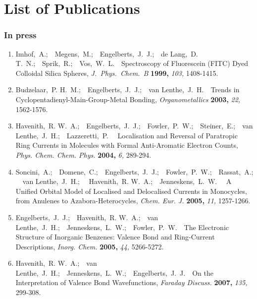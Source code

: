 \chapter*{List of Publications}
\label{lop}
\fancyhead[RO]{\thepage}
\fancyhead[LE]{\thepage}

\subsection*{In press}
\begin{enumerate}
\item
Imhof,~A.;\ \ Megens,~M.;\ \ Engelberts,~J.~J.;\ \ de Lang,~D. T.~N.;\ \ Sprik,~R.;\ \ Vos,~W.~L.\ \ Spectroscopy of
Fluorescein (FITC) Dyed Colloidal Silica Spheres, \textit{J.~Phys.~Chem.~B} \textbf{1999,} \textsl{103,} 1408-1415.

\item
Budzelaar,~P. H.~M.;\ \ Engelberts,~J.~J.;\ \ van Lenthe,~J.~H.\ \ Trends in Cyclopentadienyl-Main-Group-Metal Bonding,
\textit{Organometallics} \textbf{2003,} \textsl{22,} 1562-1576.

\item
Havenith,~R. W.~A.;\ \ Engelberts,~J.~J.;\ \ Fowler,~P.~W.;\ \ Steiner,~E.;\ \ van Lenthe,~J.~H.;\ \ Lazzeretti,~P.
\ \ Localisation and Reversal of Paratropic Ring Currents in Molecules with Formal Anti-Aromatic Electron Counts,
\textit{Phys. Chem. Chem. Phys.} \textbf{2004,} \textsl{6,} 289-294.

\item
Soncini,~A.;\ \ Domene,~C.;\ \ Engelberts,~J.~J.;\ \ Fowler,~P.~W.;\ \ Rassat,~A.;\ \ {van Lenthe},~J.~H.;
\ \ Havenith,~R. W.~A.;\ \ Jenneskens,~L.~W. \ \ A Unified Orbital Model of Localised and Delocalised Currents in Monocycles, from Anulenes to Azabora-Heterocycles, \textit{Chem. Eur. J.} \textbf{2005,} \textsl{11,} 1257-1266.

\item
Engelberts,~J.~J.;\ \ Havenith,~R. W.~A.;\ \  van Lenthe,~J.~H.;\ \ Jenneskens,~L.~W.;\ \  Fowler,~P.~W.\ \ The Electronic Structure of Inorganic Benzenes: Valence Bond and Ring-Current Descriptions,
\textit{Inorg. Chem.} \textbf{2005,} \textsl{44,} 5266-5272.

\item
Havenith,~R. W.~A.;\ \ van Lenthe,~J.~H.;\ \ Jenneskens,~L.~W.;\ \ Engelberts,~J.~J.\ \ On the Interpretation of Valence Bond Wavefunctions, \textit{Faraday Discuss.} \textbf{2007,} \textsl{135,} 299-308.
\end{enumerate}

